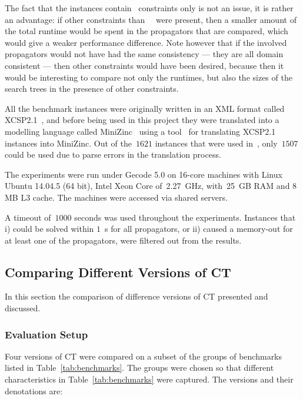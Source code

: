 \documentclass[a4paper,11pt]{article}
\theoremstyle{definition}
\newcommand{\Table}{\Constraint{Table}}
\newcommand{\CTpaper}[0]{DBLP:conf/cp/DemeulenaereHLP16}
\numberwithin{equation}{section}
\begin{document}
The fact that the instances contain \Table~constraints only is not an
issue, it is rather an advantage: if other constraints than~\Table~
were present, then a smaller amount of the total runtime would be spent
in the propagators that are compared, which would give a weaker performance
difference.
Note however that if the involved propagators would not have had
the same consistency --- they are all domain consistent ---
then other constraints would have been
desired, because then it would be interesting to compare
not only the runtimes, but also the sizes of the search trees
in the presence of other constraints.

All the benchmark instances were originally written in
an XML format called
XCSP2.1~\cite{DBLP:journals/corr/abs-0902-2362}, and before being used
in this project they were translated
into a modelling language called MiniZinc~\cite{MiniZinc}
using a tool~\cite{xcsp2mzn} for translating XCSP2.1 instances
into MiniZinc.
Out of the~$1621$ instances that were used in~\cite{\CTpaper},
only~$1507$ could be used due to parse errors in the translation process.

The experiments were run
under Gecode 5.0 on 16-core machines with Linux Ubuntu 14.04.5 (64 bit),
Intel Xeon Core of~2.27~GHz, with~25~GB RAM and 8 MB L3 cache. The machines
were accessed via shared servers.

A timeout of~$1000$ seconds was used throughout the experiments.
Instances that i) could be solved within $1$~s for all propagators, or
ii) caused a memory-out for at least one of the propagators,
were filtered out from the results.

\subsection{Comparing Different Versions of CT}
\label{sec:compare}

In this section the comparison of difference versions of CT
presented and discussed.

\subsubsection{Evaluation Setup}
Four versions of CT were compared on a subset of the groups of benchmarks
listed in Table~\ref{tab:benchmarks}. The groups were chosen so
that different characteristics in Table~\ref{tab:benchmarks} were captured.
The versions and their denotations are:
\end{document}
